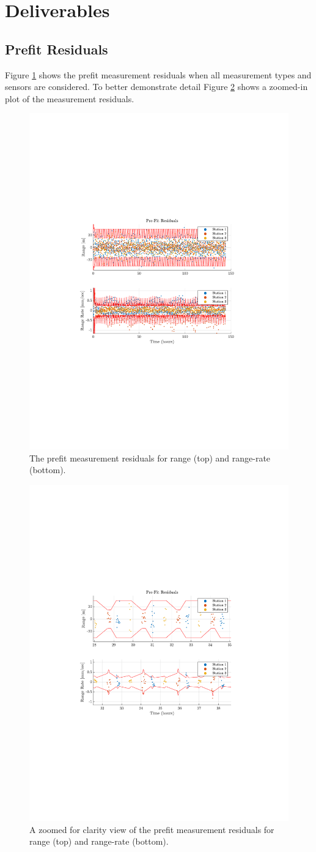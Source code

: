 \documentclass[11pt]{article}
\begin{document}
\section{Deliverables}

\subsection{Prefit Residuals}

Figure \ref{fig:prefit} shows the prefit measurement residuals when all measurement types and sensors are considered. To better demonstrate detail Figure \ref{fig:prefit_zoom1} shows a zoomed-in plot of the measurement residuals.

\begin{figure}[!htb]
	\centering
	\includegraphics[clip,trim=4cm 8.5cm 4cm 8.5cm, width=.5\textwidth]{figs/prefit_res_final.pdf}
	\caption{The prefit measurement residuals for range (top) and range-rate (bottom).}
	\label{fig:prefit}
\end{figure}

\begin{figure}[!htb]
	\centering
	\includegraphics[clip,trim=4cm 8.5cm 4cm 8.5cm, width=.5\textwidth]{figs/prefit_res_zoom1_final.pdf}
	\caption{A zoomed for clarity view of the prefit measurement residuals for range (top) and range-rate (bottom).}
	\label{fig:prefit_zoom1}
\end{figure}
\end{document}
